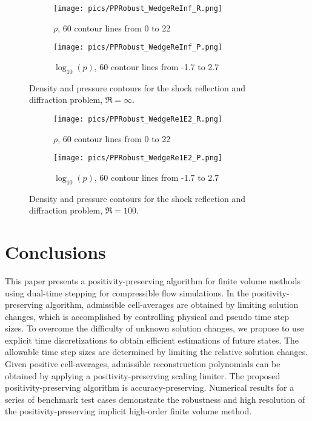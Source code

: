 \begin{figure}[htbp]
    \centering
    \begin{subfigure}{0.5\textwidth}
        \texttt{[image: pics/PPRobust\_WedgeReInf\_R.png]}
        \caption[]{$\rho$, 60 contour lines from 0 to 22}
    \end{subfigure}\hfill
    \begin{subfigure}{0.5\textwidth}
        \texttt{[image: pics/PPRobust\_WedgeReInf\_P.png]}
        \caption[]{$\log_{10}(p)$, 60 contour lines from -1.7 to 2.7}
    \end{subfigure}
    \caption{Density and pressure contours for the shock reflection and diffraction problem, $\Re=\infty$.}
    \label{fig:wedgeReInf}
\end{figure}

\begin{figure}[htbp]
    \centering
    \begin{subfigure}{0.5\textwidth}
        \texttt{[image: pics/PPRobust\_WedgeRe1E2\_R.png]}
        \caption[]{$\rho$, 60 contour lines from 0 to 22}
    \end{subfigure}\hfill
    \begin{subfigure}{0.5\textwidth}
        \texttt{[image: pics/PPRobust\_WedgeRe1E2\_P.png]}
        \caption[]{$\log_{10}(p)$, 60 contour lines from -1.7 to 2.7}
    \end{subfigure}
    \caption{Density and pressure contours for the shock reflection and diffraction problem, $\Re=100$.}
    \label{fig:wedgeRe1E2}
\end{figure}


\section{Conclusions}
\label{sec:Conclusions}

This paper presents a positivity-preserving algorithm for finite volume methods using dual-time stepping for compressible flow simulations.
In the positivity-preserving algorithm, admissible cell-averages are obtained by limiting solution changes,
which is accomplished by controlling physical and pseudo time step sizes.
To overcome the difficulty of unknown solution changes,
we propose to use explicit time discretizations to obtain efficient estimations of future states.
The allowable time step sizes are determined by limiting the relative solution changes.
Given positive cell-averages,
admissible reconstruction polynomials can be obtained by applying a positivity-preserving scaling limiter.
The proposed positivity-preserving algorithm is accuracy-preserving.
Numerical results for a series of benchmark test cases demonstrate the robustness and
high resolution of the positivity-preserving implicit high-order finite volume method.

